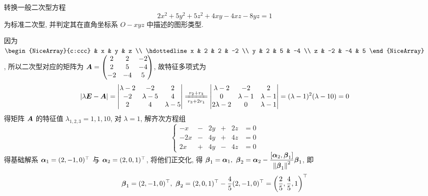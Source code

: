 \begin{example}
    转换一般二次型方程 $$2x^2+5y^2+5z^2+4xy-4xz-8yz=1$$
    为标准二次型, 并判定其在直角坐标系 $O-xyz$ 中描述的图形类型.
\end{example}
\begin{solution}
    因为 $\begin{NiceArray}{c:ccc}
              & x  & y  & z  \\ \hdottedline
            x & 2  & 2  & -2 \\
            y & 2  & 5  & -4 \\
            z & -2 & -4 & 5
        \end{NiceArray}$, 所以二次型对应的矩阵为 $\vb*{A}=\begin{pmatrix}
            2  & 2  & -2 \\
            2  & 5  & -4 \\
            -2 & -4 & 5
        \end{pmatrix}$, 故特征多项式为
    $$|\lambda\vb*{E}-\vb*{A}|=\begin{vmatrix}
            \lambda -2 & -2         & 2         \\
            -2         & \lambda -5 & 4         \\
            2          & 4          & \lambda-5
        \end{vmatrix}\xlongequal[r_3+2r_1]{r_2+r_3}\begin{vmatrix}
            \lambda -2  & -2         & 2          \\
            0           & \lambda -1 & \lambda -1 \\
            2\lambda -2 & 0          & \lambda -1
        \end{vmatrix}=(\lambda-1)^2(\lambda-10)=0$$
    得矩阵 $\vb*{A}$ 的特征值 $\lambda_{1,2,3}=1,1,10$, 对 $\lambda=1$, 解齐次方程组
    $$\left\{\begin{matrix}
            -x  & - & 2y & + & 2z & =0 \\
            -2x & - & 4y & + & 4z & =0 \\
            2x  & + & 4y & - & 4z & =0
        \end{matrix}\right.$$
    得基础解系 $\vb*{\alpha}_1=(2,-1,0)^\top$ 与 $\vb*{\alpha}_2=(2,0,1)^\top$, 将他们正交化, 得 $\vb*{\beta}_1=\vb*{\alpha}_1,~\vb*{\beta}_2=\vb*{\alpha}_2-\dfrac{\comm{\vb*{\alpha}_2}{\vb*{\beta}_1}}{\norm{\vb*{\beta}_1}^2}\vb*{\beta}_1$, 即
    $$\vb*{\beta}_1=(2,-1,0)^\top,~\vb*{\beta}_2=(2,0,1)^\top-\dfrac{4}{5}(2,-1,0)^\top=\qty(\dfrac{2}{5},\dfrac{4}{5},1)^\top$$

\end{solution}
